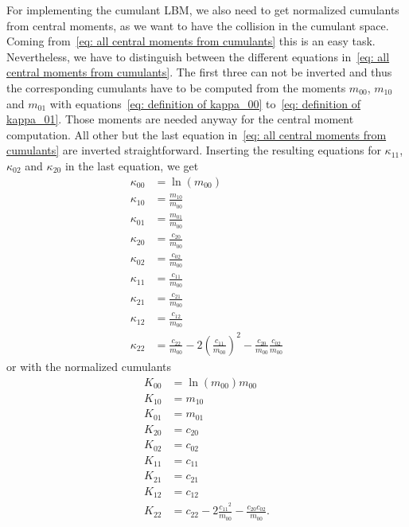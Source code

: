 For implementing the cumulant LBM, we also need to get normalized cumulants from central moments, as we want to have the collision in the cumulant space.
Coming from~\eqref{eq: all central moments from cumulants} this is an easy task.
Nevertheless, we have to distinguish between the different equations in~\eqref{eq: all central moments from cumulants}.
The first three can not be inverted and thus the corresponding cumulants have to be computed from the moments $m_{00}$, $m_{10}$ and $m_{01}$ with equations~\eqref{eq: definition of kappa_00} to~\eqref{eq: definition of kappa_01}.
Those moments are needed anyway for the central moment computation.
All other but the last equation in~\eqref{eq: all central moments from cumulants} are inverted straightforward.
Inserting the resulting equations for $\kappa_{11}$, $\kappa_{02}$ and $\kappa_{20}$ in the last equation, we get
\begin{equation}
  \label{eq: all cumulants from central moments}
  \begin{aligned}
    \kappa_{00} & = \ln(m_{00})\\
    \kappa_{10} & = \frac{m_{10}}{m_{00}} \\
    \kappa_{01} & = \frac{m_{01}}{m_{00}} \\
    \kappa_{20} & = \frac{c_{20}}{m_{00}} \\
    \kappa_{02} & = \frac{c_{02}}{m_{00}} \\
    \kappa_{11} & = \frac{c_{11}}{m_{00}} \\
    \kappa_{21} & = \frac{c_{21}}{m_{00}} \\
    \kappa_{12} & = \frac{c_{12}}{m_{00}} \\
    \kappa_{22} & = \frac{c_{22}}{m_{00}} - 2{\left(\frac{c_{11}}{m_{00}}\right)}^2 - \frac{c_{20}}{m_{00}}\frac{c_{02}}{m_{00}}
  \end{aligned}
\end{equation}
%
or with the normalized cumulants
\begin{equation}
  \begin{aligned}
    \label{eq: all normalized cumulants from central moments}
    K_{00} & = \ln(m_{00})m_{00} \\
    K_{10} & = m_{10} \\
    K_{01} & = m_{01} \\
    K_{20} & = c_{20} \\
    K_{02} & = c_{02} \\
    K_{11} & = c_{11} \\
    K_{21} & = c_{21} \\
    K_{12} & = c_{12} \\
    K_{22} & = c_{22} - 2 \frac{{c_{11}}^2}{m_{00}} - \frac{c_{20}c_{02}}{m_{00}}.
  \end{aligned}
\end{equation}
